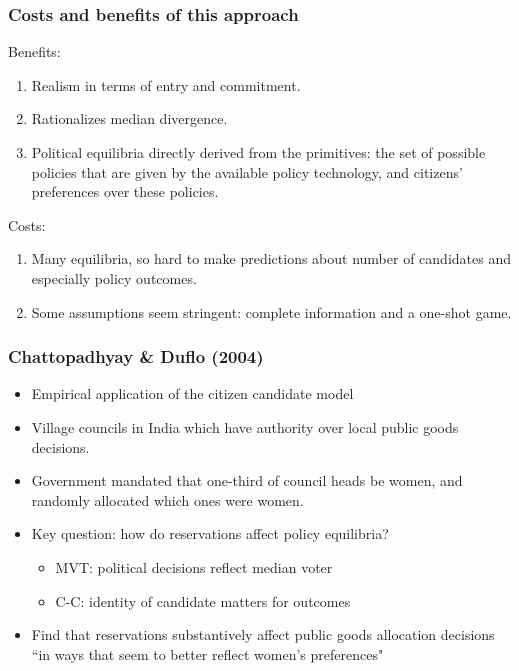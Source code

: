 \documentclass[11pt,aspectratio=169]{beamer}
\begin{document}
\begin{frame}
\frametitle{Costs and benefits of this approach}

Benefits: \begin{enumerate}
\item Realism in terms of entry and commitment.
\item Rationalizes median divergence. 
\item Political equilibria directly derived from the primitives: the set of possible policies that are given by the available policy technology, and citizens' preferences over these policies. 
\end{enumerate}

\bigskip

Costs: \begin{enumerate}
\item Many equilibria, so hard to make predictions about number of candidates and especially policy outcomes. 
\item Some assumptions seem stringent: complete information and a one-shot game.
\end{enumerate}

\end{frame}

\begin{frame}
\frametitle{Chattopadhyay \& Duflo (2004)}

\begin{itemize}
\item Empirical application of the citizen candidate model
\item Village councils in India which have authority over local public goods decisions.
\item Government mandated that one-third of council heads be women, and randomly allocated which ones were women.
\item Key question: how do reservations affect policy equilibria? 
\begin{itemize}
\item MVT: political decisions reflect median voter
\item C-C: identity of candidate matters for outcomes
\end{itemize}
\item Find that reservations substantively affect public goods allocation decisions ``in ways that seem to better reflect women's preferences"
\end{itemize}

\end{frame}
\end{document}
